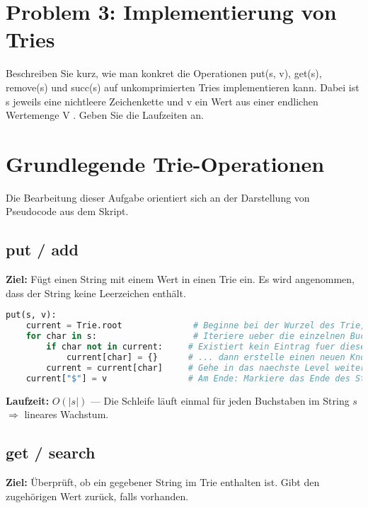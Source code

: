 \section*{Problem 3: Implementierung von Tries} 


\noindent
Beschreiben Sie kurz, wie man konkret die Operationen put(s, v), get(s), remove(s)
und succ(s) auf unkomprimierten Tries implementieren kann. Dabei ist s jeweils
eine nichtleere Zeichenkette und v ein Wert aus einer endlichen Wertemenge V .
Geben Sie die Laufzeiten an.\\

\section*{Grundlegende Trie-Operationen}

Die Bearbeitung dieser Aufgabe orientiert sich an der Darstellung von Pseudocode aus dem Skript.

\subsection*{put / add}

\textbf{Ziel:} Fügt einen String mit einem Wert in einen Trie ein. Es wird angenommen, dass der String keine Leerzeichen enthält.

\begin{lstlisting}[language=Python]
put(s, v):
    current = Trie.root              # Beginne bei der Wurzel des Trie, diese ist immer leer.
    for char in s:                   # Iteriere ueber die einzelnen Buchstaben des Strings.
        if char not in current:     # Existiert kein Eintrag fuer diesen Buchstaben ...
            current[char] = {}      # ... dann erstelle einen neuen Knoten (Dictionary).
        current = current[char]     # Gehe in das naechste Level weiter.
    current["$"] = v                # Am Ende: Markiere das Ende des Strings mit "$" und speichere den Wert v.
\end{lstlisting}

\textbf{Laufzeit:} $O(|s|)$ — Die Schleife läuft einmal für jeden Buchstaben im String $s$ $\Rightarrow$ lineares Wachstum.

\subsection*{get / search}

\textbf{Ziel:} Überprüft, ob ein gegebener String im Trie enthalten ist. Gibt den zugehörigen Wert zurück, falls vorhanden.

